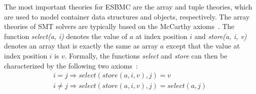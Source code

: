 \documentclass[a4paper]{llncs}
\begin{document}

\smallskip{}
%
The most important theories for ESBMC are the array and tuple theories,
which are used to model container data structures and objects,
respectively.
The array theories of SMT solvers are typically based on the
McCarthy axioms~\cite{McCarthy62}. The function \emph{select(a, i)}
denotes the value of $a$ at index position $i$ and \emph{store(a, i, v)}
denotes an array that is exactly the same as array $a$ except that the
value at index position $i$ is $v$. %
Formally, the functions \emph{select} and \emph{store} can then be characterized
by the following two axioms~\cite{CVC07,Boolector09,Z08}:
%
\[
\begin{array}{l}
  i=j      \Rightarrow select\left(store\left(a,i,v\right),j\right)=v \\
  i \neq j \Rightarrow select\left(store\left(a,i,v\right),j\right)=select\left(a,j\right)
\end{array}
\]
\end{document}
